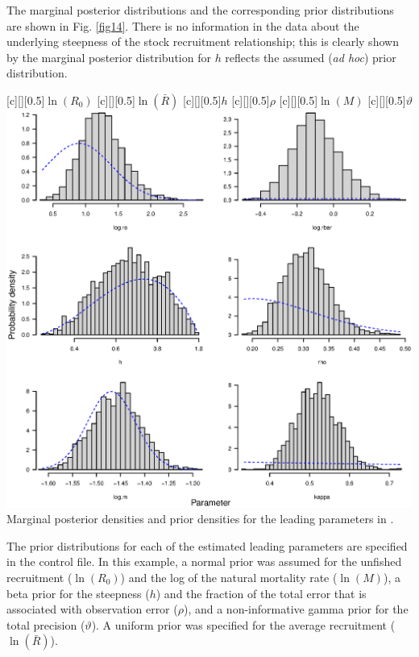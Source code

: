 \begin{multicols}{2}
The marginal posterior distributions and the corresponding prior distributions are shown in Fig. \ref{fig14}.  There is no information in the data about the underlying steepness of the stock recruitment relationship; this is clearly shown by the marginal posterior distribution for $h$ reflects the assumed (\emph{ad hoc}) prior distribution.

\begin{figurehere}
	\centering
	[][0.5]{$\ln(R_0)$}
	[][0.5]{$\ln(\bar{R})$}
	[][0.5]{$h$}
	[][0.5]{$\rho$}
	[][0.5]{$\ln(M)$}
	[][0.5]{$\vartheta$}
	\includegraphics[width=\columnwidth]{iscamFigs/phakefig5.eps}\\
	\caption{Marginal posterior densities and prior densities for the leading parameters in \iscam.}\label{fig14}
\end{figurehere}

The prior distributions for each of the estimated leading parameters are specified in the control file.  In this example, a normal prior was assumed for the unfished recruitment ($\ln(R_0)$) and the log of the natural mortality rate ($\ln(M)$), a beta prior for the steepness ($h$) and the fraction of the total error that is associated with observation error ($\rho$), and a non-informative gamma prior for the total precision ($\vartheta$).  A uniform prior was specified for the average recruitment ($\ln(\bar{R})$).


\end{multicols}
